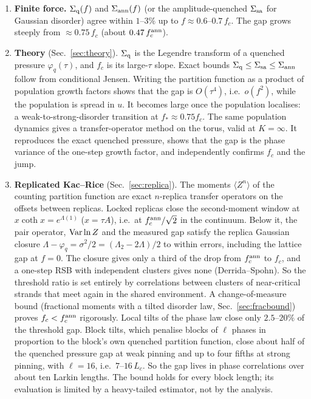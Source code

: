 \documentclass[10pt,a4paper]{article}
\newcommand{\Sann}{\Sigma_{\rm ann}}
\newcommand{\Sq}{\Sigma_{\rm q}}
\begin{document}
\begin{enumerate}
For FLRT's Gaussian disorder, $\Sq(0)$ is $2\%$ below $\Sann(0)$. The reason is the random site amplitude $|\xi_i|$, which is shared by all branches. A parameter-free theory, annealed over the phases and quenched over the amplitudes, predicts a rate gap of $0.0067\pm0.0002$, against the measured $0.006$--$0.008$.
\item \textbf{Finite force.} $\Sq(f)$ and $\Sann(f)$ (or the amplitude-quenched $\Sigma_{\rm sa}$ for Gaussian disorder) agree within $1$--$3\%$ up to $f\approx0.6$--$0.7\,f_c$. The gap grows steeply from $\approx0.75\,f_c$ (about $0.47\,f_c^{\rm ann}$).
\item \textbf{Theory} (Sec.~\ref{sec:theory}). $\Sq$ is the Legendre transform of a quenched pressure $\varphi_q(\tau)$, and $f_c$ is its large-$\tau$ slope. Exact bounds $\Sq\le\Sigma_{\rm sa}\le\Sann$ follow from conditional Jensen. Writing the partition function as a product of population growth factors shows that the gap is $O(\tau^4)$, i.e.\ $o(f^2)$, while the population is spread in $u$. It becomes large once the population localises: a weak-to-strong-disorder transition at $f_*\approx0.75f_c$. The same population dynamics gives a transfer-operator method on the torus, valid at $K=\infty$. It reproduces the exact quenched pressure, shows that the gap is the phase variance of the one-step growth factor, and independently confirms $f_c$ and the jump.
\item \textbf{Replicated Kac--Rice} (Sec.~\ref{sec:replica}). The moments $\langle Z^n\rangle$ of the counting partition function are exact $n$-replica transfer operators on the offsets between replicas. Locked replicas close the second-moment window at $x\coth x=e^{\Lambda(1)}$ ($x=\tau A$), i.e.\ at $f_c^{\rm ann}/\sqrt2$ in the continuum. Below it, the pair operator, ${\rm Var}\ln Z$ and the measured gap satisfy the replica Gaussian closure $\Lambda-\varphi_q=\sigma^2/2=(\Lambda_2-2\Lambda)/2$ to within errors, including the lattice gap at $f=0$. The closure gives only a third of the drop from $f_c^{\rm ann}$ to $f_c$, and a one-step RSB with independent clusters gives none (Derrida--Spohn). So the threshold ratio is set entirely by correlations between clusters of near-critical strands that meet again in the shared environment. A change-of-measure bound (fractional moments with a tilted disorder law, Sec.~\ref{sec:fracbound}) proves $f_c<f_c^{\rm ann}$ rigorously. Local tilts of the phase law close only $2.5$--$20\%$ of the threshold gap. Block tilts, which penalise blocks of $\ell$ phases in proportion to the block's own quenched partition function, close about half of the quenched pressure gap at weak pinning and up to four fifths at strong pinning, with $\ell=16$, i.e.\ $7$--$16\,L_c$. So the gap lives in phase correlations over about ten Larkin lengths. The bound holds for every block length; its evaluation is limited by a heavy-tailed estimator, not by the analysis.

\end{enumerate}
\end{document}

